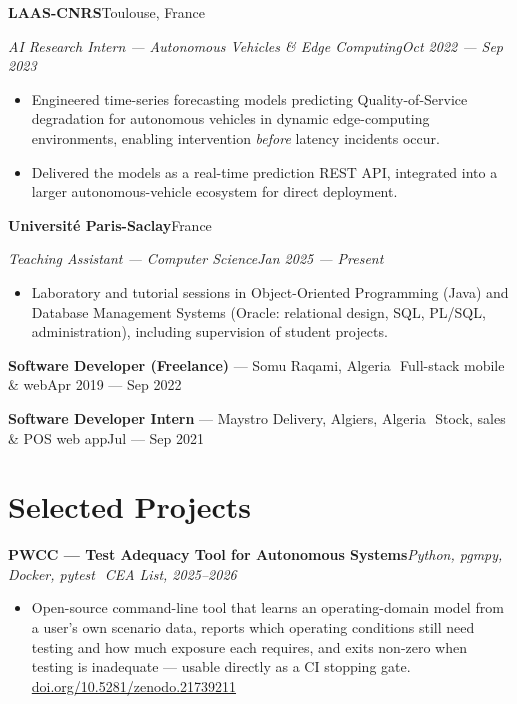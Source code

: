 \documentclass[a4paper,10pt]{article}
\newcommand{\cventry}[4]{%
  \vspace{3pt}%
  \begingroup\parfillskip=0pt\relax
    \textbf{#1}\hfill #2\par
    \textit{#3}\hfill \textit{#4}\par
  \endgroup
  \vspace{1pt}%
}
\newcommand{\cvproject}[2]{%
  \vspace{3pt}%
  \begingroup\parfillskip=0pt\relax
    \textbf{#1}\hfill \textit{#2}\par
  \endgroup
  \vspace{1pt}%
}
\newcommand{\cvline}[2]{%
  \begingroup\parfillskip=0pt\relax
    #1\hfill #2\par
  \endgroup
  \vspace{1pt}%
}
\newcommand{\cvdot}{\,\textperiodcentered\,}
\begin{document}
\cventry{LAAS-CNRS}{Toulouse, France}
      {AI Research Intern --- Autonomous Vehicles \& Edge Computing}{Oct 2022 --- Sep 2023}
\begin{itemize}
  \item Engineered time-series forecasting models predicting Quality-of-Service degradation for autonomous vehicles in dynamic edge-computing environments, enabling intervention \emph{before} latency incidents occur.
  \item Delivered the models as a real-time prediction REST API, integrated into a larger autonomous-vehicle ecosystem for direct deployment.
\end{itemize}

\cventry{Universit\'e Paris-Saclay}{France}
      {Teaching Assistant --- Computer Science}{Jan 2025 --- Present}
\begin{itemize}
  \item Laboratory and tutorial sessions in Object-Oriented Programming (Java) and Database Management Systems (Oracle: relational design, SQL, PL/SQL, administration), including supervision of student projects.
\end{itemize}

\vspace{3pt}
\cvline{\small\textbf{Software Developer (Freelance)} --- Somu Raqami, Algeria \cvdot Full-stack mobile \& web}{\small Apr 2019 --- Sep 2022}
\cvline{\small\textbf{Software Developer Intern} --- Maystro Delivery, Algiers, Algeria \cvdot Stock, sales \& POS web app}{\small Jul --- Sep 2021}

\section*{Selected Projects}

\cvproject{PWCC --- Test Adequacy Tool for Autonomous Systems}{Python, pgmpy, Docker, pytest \cvdot CEA List, 2025--2026}
\begin{itemize}
  \item Open-source command-line tool that learns an operating-domain model from a user's own scenario data, reports which operating conditions still need testing and how much exposure each requires, and exits non-zero when testing is inadequate --- usable directly as a CI stopping gate. \href{https://doi.org/10.5281/zenodo.21739211}{doi.org/10.5281/zenodo.21739211}
\end{itemize}
\end{document}
